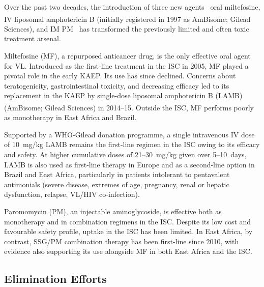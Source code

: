 Over the past two decades, the introduction of three new agents \textemdash\ oral miltefosine, IV liposomal amphotericin B (initially registered in 1997 as AmBisome\textsuperscript{\textregistered}; Gilead Sciences), and IM PM \textemdash\  has transformed the previously limited and often toxic treatment arsenal\cite{alves2018}.

Miltefosine (MF), a repurposed anticancer drug, is the only effective oral agent for VL. Introduced as the first-line treatment in the ISC in 2005, MF played a pivotal role in the early KAEP\cite{sundar2002,bhattacharya2007,who_sea_elim2005}. Its use has since declined. Concerns about teratogenicity, gastrointestinal toxicity, and decreasing efficacy\cite{rijal2013,sundar2012} led to its replacement in the KAEP by single-dose liposomal amphotericin B (LAMB) (AmBisome\textsuperscript{\textregistered}; Gilead Sciences) in 2014--15\cite{chatterjee2025}. Outside the ISC, MF performs poorly as monotherapy in East Africa and Brazil\cite{alves2018, carnielli2019}.

Supported by a WHO-Gilead donation programme, a single intravenous IV dose of 10~mg/kg LAMB remains the first-line regimen in the ISC owing to its efficacy and safety\cite{WHO2023GileadAgreement}. At higher cumulative doses of 21--30~mg/kg given over 5--10~days, LAMB is also used as first-line therapy in Europe and as a second-line option in Brazil and East Africa, particularly in patients intolerant to pentavalent antimonials (severe disease, extremes of age, pregnancy, renal or hepatic dysfunction, relapse, VL/HIV co-infection).

Paromomycin (PM), an injectable aminoglycoside, is effective both as monotherapy and in combination regimens in the ISC\cite{sundar2007a}. Despite its low cost and favourable safety profile, uptake in the ISC has been limited. In East Africa, by contrast, SSG/PM combination therapy has been first-line since 2010\cite{WHO_TRS_949_2010,musa2012}, with evidence also supporting its use alongside MF in both East Africa and the ISC\cite{musa2023,sundar2011comb}.

\subsection{Elimination Efforts}

